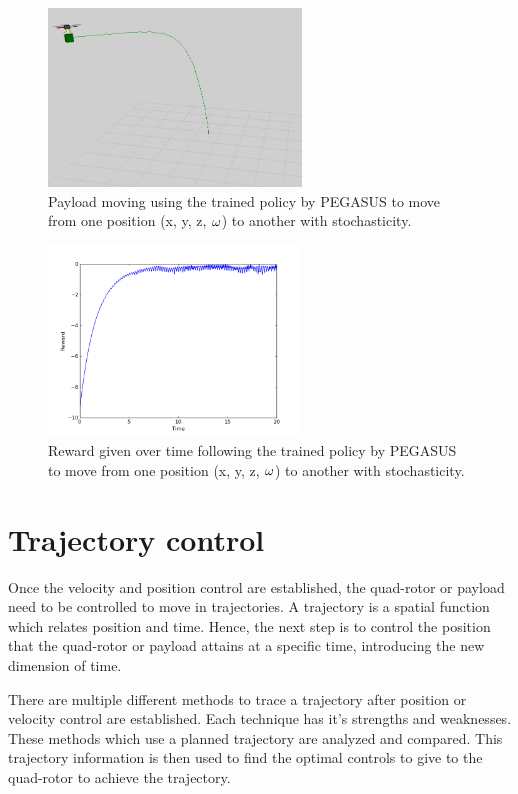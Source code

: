 \documentclass[hidelinks,BTech]{iitmdiss}
\begin{document}
\begin{figure}[H]
  \centering
    \includegraphics[width=0.6\textwidth]{payload_position_control.png}
    \caption{Payload moving using the trained policy by PEGASUS to move from one position (x, y, z, $\protect\omega$) to another with stochasticity.}
\end{figure}

\begin{figure}[H]
  \centering
    \includegraphics[width=0.6\textwidth]{payload_reward.png}
    \caption{Reward given over time following the trained policy by PEGASUS to move from one position (x, y, z, $\protect\omega$) to another with stochasticity.}
\end{figure}

\chapter{Trajectory control}

Once the velocity and position control are established, the quad-rotor or payload need to be controlled to move in trajectories. A trajectory is a spatial function which relates position and time. Hence, the next step is to control the position that the quad-rotor or payload attains at a specific time, introducing the new dimension of time.

There are multiple different methods to trace a trajectory after position or velocity control are established. Each technique has it's strengths and weaknesses. These methods which use a planned trajectory are analyzed and compared. This trajectory information is then used to find the optimal controls to give to the quad-rotor to achieve the trajectory.
\end{document}
